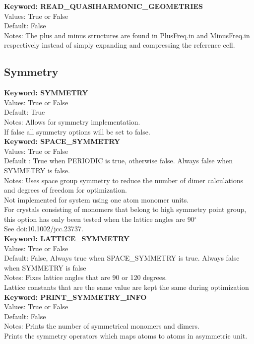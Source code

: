 \documentclass[11pt,letterpaper]{article}
\begin{document}
\begin{spacing}{1.0}
\noindent
\textbf{Keyword: READ\_QUASIHARMONIC\_GEOMETRIES} \\
Values: True or False\\
Default: False\\
Notes: The plus and minus structures are found in PlusFreq.in and MinusFreq.in respectively instead of 
           simply expanding and compressing the reference cell.\\

\subsection{Symmetry}

\noindent
\textbf{Keyword: SYMMETRY} \\
Values: True or False\\
Default: True\\
Notes: Allows for symmetry implementation.\\
        If false all symmetry options will be set to false.\\

\noindent
\textbf{Keyword: SPACE\_SYMMETRY} \\
Values: True or False\\
Default : True when PERIODIC is true, otherwise false. Always false when 
SYMMETRY is false.\\
Notes: Uses space group symmetry to reduce the number of
dimer calculations and degrees of freedom for optimization.\\
Not implemented for system using one atom monomer units.\\
For crystals consisting of monomers that belong to high symmetry point group, \\
this option has only been tested when the lattice angles are 90$^{\circ}$\\
See doi:10.1002/jcc.23737.\\

\noindent
\textbf{Keyword: LATTICE\_SYMMETRY}\\
Values: True or False\\
Default: False, Always true when SPACE\_SYMMETRY is true. Always false when SYMMETRY is false\\
Notes:  Fixes lattice angles that are 90 or 120 degrees.\\
        Lattice constants that are the same value are kept the same during optimization\\

\noindent
\textbf{Keyword: PRINT\_SYMMETRY\_INFO}\\
Values: True or False\\
Default: False\\
Notes: Prints the number of symmetrical monomers and dimers.\\
       Prints the symmetry operators which maps atoms 
to atoms in asymmetric unit.\\


\end{spacing}
\end{document}

